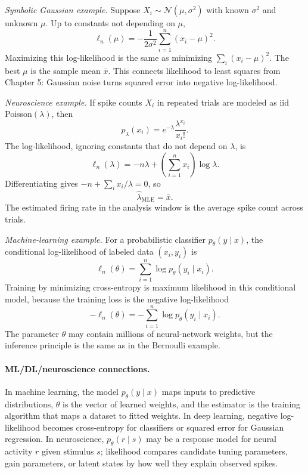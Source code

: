\emph{Symbolic Gaussian example.}
Suppose \(X_i\sim\mathcal N(\mu,\sigma^2)\) with known \(\sigma^2\) and unknown \(\mu\). Up to constants not depending on \(\mu\),
\[
\ell_n(\mu)
=-\frac{1}{2\sigma^2}\sum_{i=1}^n (x_i-\mu)^2.
\]
Maximizing this log-likelihood is the same as minimizing \(\sum_i(x_i-\mu)^2\). The best \(\mu\) is the sample mean \(\bar x\). This connects likelihood to least squares from Chapter 5: Gaussian noise turns squared error into negative log-likelihood.

\emph{Neuroscience example.}
If spike counts \(X_i\) in repeated trials are modeled as iid Poisson\((\lambda)\), then
\[
p_\lambda(x_i)=e^{-\lambda}\frac{\lambda^{x_i}}{x_i!}.
\]
The log-likelihood, ignoring constants that do not depend on \(\lambda\), is
\[
\ell_n(\lambda)=-n\lambda+\left(\sum_{i=1}^n x_i\right)\log\lambda.
\]
Differentiating gives \(-n+\sum_i x_i/\lambda=0\), so
\[
\hat\lambda_{\mathrm{MLE}}=\bar x.
\]
The estimated firing rate in the analysis window is the average spike count across trials.

\emph{Machine-learning example.}
For a probabilistic classifier \(p_\theta(y\mid x)\), the conditional log-likelihood of labeled data \((x_i,y_i)\) is
\[
\ell_n(\theta)=\sum_{i=1}^n \log p_\theta(y_i\mid x_i).
\]
Training by minimizing cross-entropy is maximum likelihood in this conditional model, because the training loss is the negative log-likelihood
\[
-\ell_n(\theta)=-\sum_{i=1}^n \log p_\theta(y_i\mid x_i).
\]
The parameter \(\theta\) may contain millions of neural-network weights, but the inference principle is the same as in the Bernoulli example.

\paragraph{ML/DL/neuroscience connections.}
In machine learning, the model \(p_\theta(y\mid x)\) maps inputs to predictive distributions, \(\theta\) is the vector of learned weights, and the estimator is the training algorithm that maps a dataset to fitted weights. In deep learning, negative log-likelihood becomes cross-entropy for classifiers or squared error for Gaussian regression. In neuroscience, \(p_\theta(r\mid s)\) may be a response model for neural activity \(r\) given stimulus \(s\); likelihood compares candidate tuning parameters, gain parameters, or latent states by how well they explain observed spikes.

